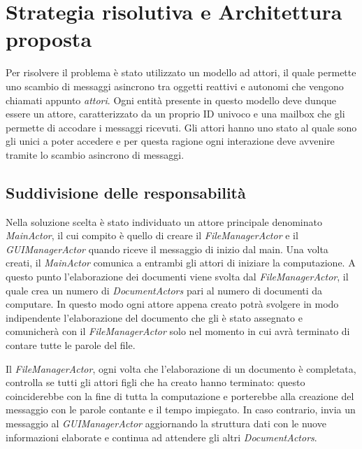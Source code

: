 \section{Strategia risolutiva e Architettura proposta}
Per risolvere il problema è stato utilizzato un modello ad attori, il quale permette uno scambio di messaggi asincrono tra oggetti reattivi e autonomi che vengono chiamati appunto \textit{attori}.\newline
Ogni entità presente in questo modello deve dunque essere un attore, caratterizzato da un proprio ID univoco e una mailbox che gli permette di accodare i messaggi ricevuti. Gli attori hanno uno stato al quale sono gli unici a poter accedere e per questa ragione ogni interazione deve avvenire tramite lo scambio asincrono di messaggi.

\subsection{Suddivisione delle responsabilità}
Nella soluzione scelta è stato individuato un attore principale denominato \textit{MainActor}, il cui compito è quello di creare il \textit{FileManagerActor} e il \textit{GUIManagerActor} quando riceve il messaggio di inizio dal main. Una volta creati, il \textit{MainActor} comunica a entrambi gli attori di iniziare la computazione.\newline
A questo punto l'elaborazione dei documenti viene svolta dal \textit{FileManagerActor}, il quale crea un numero di \textit{DocumentActors} pari al numero di documenti da computare. In questo modo ogni attore appena creato potrà svolgere in modo indipendente l'elaborazione del documento che gli è stato assegnato e comunicherà con il \textit{FileManagerActor} solo nel momento in cui avrà terminato di contare tutte le parole del file.\newline

\noindent Il \textit{FileManagerActor}, ogni volta che l'elaborazione di un documento è completata, controlla se tutti gli attori figli che ha creato hanno terminato: questo coinciderebbe con la fine di tutta la computazione e porterebbe alla creazione del messaggio con le parole contante e il tempo impiegato. In caso contrario, invia un messaggio al \textit{GUIManagerActor} aggiornando la struttura dati con le nuove informazioni elaborate e continua ad attendere gli altri \textit{DocumentActors}.

